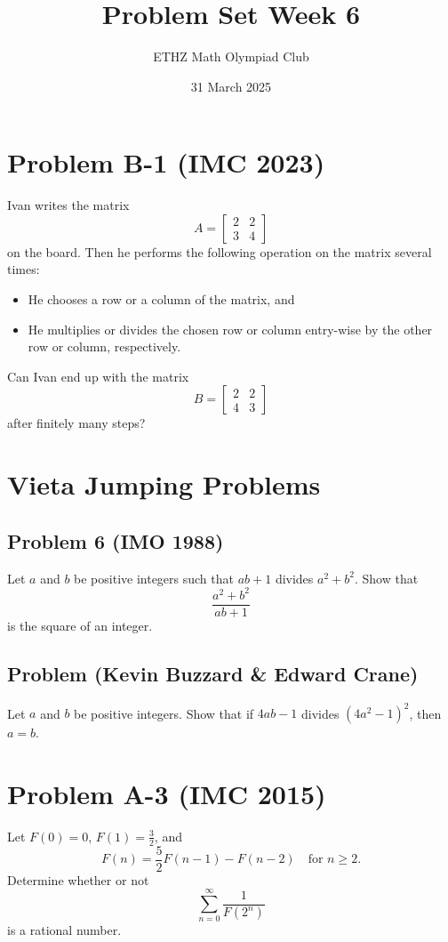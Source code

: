\documentclass[11pt, a4paper, oneside]{article}
\title{Problem Set Week 6}
\author{ETHZ Math Olympiad Club}
\date{31 March 2025}
\newcommand{\problem}[1][]{\section{#1} \hfill \par}
\theoremstyle{remark}
\begin{document}
\maketitle
\problem[Problem B-1 (IMC 2023)]
Ivan writes the matrix
\[
A = \begin{bmatrix} 2 & 2 \\ 3 & 4 \end{bmatrix}
\]
on the board. Then he performs the following operation on the matrix several times:
\begin{itemize}
    \item He chooses a row or a column of the matrix, and
    \item He multiplies or divides the chosen row or column entry-wise by the other row or column, respectively.
\end{itemize}
Can Ivan end up with the matrix
\[
B = \begin{bmatrix} 2 & 2 \\ 4 & 3 \end{bmatrix}
\]
after finitely many steps?
\problem[Vieta Jumping Problems]
\subsection{Problem 6 (IMO 1988)}
Let \( a \) and \( b \) be positive integers such that \( ab + 1 \) divides \( a^{2} + b^{2} \). Show that
\[ \frac{a^{2} + b^{2}}{ab + 1} \]
is the square of an integer.
\subsection{Problem (Kevin Buzzard \& Edward Crane)}
Let $a$ and $b$ be positive integers. Show that if $4ab - 1$ divides $\left(4a^{2} - 1\right)^{2}$, then $a = b$. 
\problem[Problem A-3 (IMC 2015)] Let $F(0) = 0$, $F(1) =\frac{3}{2}$, and 
\[
F(n) = \frac{5}{2}F(n-1) - F(n-2) \quad \text{for } n \geq 2.
\]
Determine whether or not
\[
\sum_{n=0}^{\infty} \frac{1}{F(2^n)}
\]
is a rational number.
\end{document}
